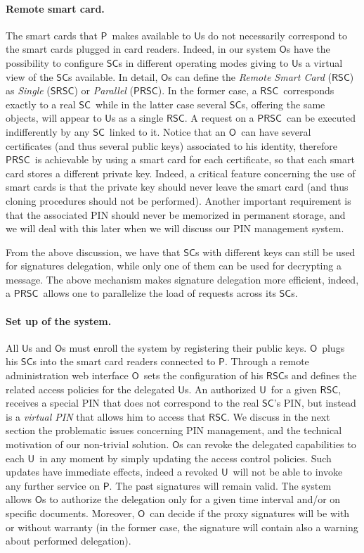 \documentclass[runningheads]{llncs}
\newcommand{\Owner}{\ensuremath{\mathsf{O}}}
\newcommand{\User}{\ensuremath{\mathsf{U}}}
\newcommand{\Proxy}{\ensuremath{\mathsf{P}}}
\newcommand{\SC}{\ensuremath{\mathsf{SC}}}
\newcommand{\RSC}{\ensuremath{\mathsf{RSC}}}
\newcommand{\SRSC}{\ensuremath{\mathsf{SRSC}}}
\newcommand{\PRSC}{\ensuremath{\mathsf{PRSC}}}
\begin{document}
\paragraph{Remote smart card.}
The smart cards that \Proxy\ makes available to \User s do not necessarily correspond to the smart cards plugged in card readers. Indeed, in our system \Owner s have the possibility to configure \SC s in different operating modes giving to \User s a virtual view of the \SC s available. In detail, \Owner s can define the \emph{Remote Smart Card} (\RSC) as \emph{Single} (\SRSC) or \emph{Parallel} (\PRSC). In the former case, a \RSC\ corresponds exactly to a real \SC\ while in the latter case several \SC s, offering the same objects, will appear to \User s as a single \RSC . A request on a \PRSC\ can be executed indifferently by any \SC\ linked to it. Notice that an \Owner\ can have several certificates (and thus several public keys) associated to his identity, therefore \PRSC\ is achievable by using a smart card for each certificate, so that each smart card stores a different private key. Indeed, a critical feature concerning the use of smart cards is that the private key should never leave the smart card (and thus cloning procedures should not be performed).
Another important requirement is that the associated PIN should never be memorized in permanent storage, and we will deal with this later when we will discuss our PIN management system.

From the above discussion, we have that  \SC s with different keys can still be used for signatures delegation,  while only one of them can be used for decrypting a message. The above mechanism makes signature delegation more efficient, indeed, a \PRSC\ allows one to parallelize the load of requests across its \SC s.

\paragraph{Set up of the system.}
All \User s and \Owner s must enroll the system by registering their public keys. \Owner\ plugs his \SC s into the smart card readers connected to \Proxy. Through a remote administration web interface \Owner\ sets the configuration of his \RSC s and defines the related access policies for the delegated \User s. An authorized \User\ for a given \RSC, receives a special PIN that does not correspond to the real \SC 's PIN, but instead is a \emph{virtual PIN} that allows him to access  that \RSC. We discuss in the next section the problematic issues concerning  PIN management, and the technical motivation of our non-trivial solution. \Owner s can revoke the delegated capabilities to each \User\ in any moment by simply updating the access control policies. Such updates have immediate effects, indeed a revoked \User\ will not be able to invoke any further service on \Proxy . The past signatures will remain valid. The system allows \Owner s to authorize the delegation only for a given time interval and/or on specific documents. Moreover, \Owner\ can decide if the proxy signatures will be with or without warranty (in the former case, the signature will contain also a warning about performed delegation).
\end{document}
